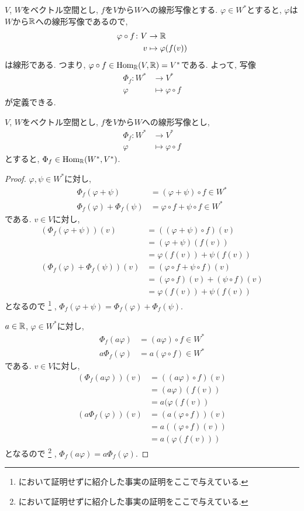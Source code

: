 $V$, $W$をベクトル空間とし,
$f$を$V$から$W$への線形写像とする.
$\varphi\in W^\ast$とすると,
$\varphi$は$W$から$\mathbb{R}$への線形写像であるので,
\begin{align*}
  \varphi\circ f \colon V&\to \mathbb{R}\\
  v&\mapsto \varphi(f(v))
\end{align*}
は線形である.
つまり, $\varphi\circ f \in \operatorname{Hom}_{\mathbb{R}}(V,\mathbb{R})=V^\ast$である.
よって,
写像
\begin{align*}
  \Phi_f\colon W^\ast &\to V^\ast\\
  \varphi &\mapsto \varphi\circ f
\end{align*}
が定義できる.
\begin{lemma}
$V$, $W$をベクトル空間とし,
$f$を$V$から$W$への線形写像とし,
\begin{align*}
  \Phi_f\colon W^\ast &\to V^\ast\\
  \varphi &\mapsto \varphi\circ f
\end{align*}
とすると, $\Phi_f\in \operatorname{Hom}_{\mathbb{R}}(W^\ast,V^\ast)$.
\end{lemma}
\begin{proof}
  $\varphi,\psi\in W^\ast$に対し,
  \begin{align*}
    \Phi_f(\varphi+\psi)&=(\varphi+\psi)\circ f \in W^\ast\\
    \Phi_f(\varphi)+\Phi_f(\psi)&=\varphi\circ f+\psi\circ f \in W^\ast
  \end{align*}
  である.
  $v\in V$に対し,
  \begin{align*}
    (\Phi_f(\varphi+\psi))(v)
    &=((\varphi+\psi)\circ f )(v)\\
    &=(\varphi+\psi)(f (v))\\
    &=\varphi(f (v))+\psi(f (v))\\
    (\Phi_f(\varphi)+\Phi_f(\psi))(v)
    &=(\varphi\circ f+\psi\circ f )(v)\\
    &=(\varphi\circ f)(v)+(\psi\circ f )(v)\\
    &=\varphi(f(v))+\psi( f (v))
  \end{align*}
  となるので%
  \footnote{において証明せずに紹介した事実の証明をここで与えている.}%
  ,
  $\Phi_f(\varphi+\psi)=\Phi_f(\varphi)+\Phi_f(\psi)$.

  $a\in \mathbb{R}$,
  $\varphi\in W^\ast$に対し,
  \begin{align*}
    \Phi_f(a\varphi)&=(a\varphi)\circ f \in W^\ast\\
    a\Phi_f(\varphi)&=a(\varphi\circ f)\in W^\ast
  \end{align*}
  である.
  $v\in V$に対し,
  \begin{align*}
    (\Phi_f(a\varphi))(v)
    &=((a\varphi)\circ f)(v)\\ 
    &=(a\varphi)(f(v))\\ 
    &=a(\varphi(f(v))\\ 
    (a\Phi_f(\varphi))(v)
    &=(a(\varphi\circ f))(v)\\
    &=a((\varphi\circ f)(v))\\
    &=a(\varphi(f(v)))
  \end{align*}
  となるので%
  \footnote{において証明せずに紹介した事実の証明をここで与えている.}%
  ,
  $\Phi_f(a\varphi)=a\Phi_f(\varphi)$.
\end{proof}
